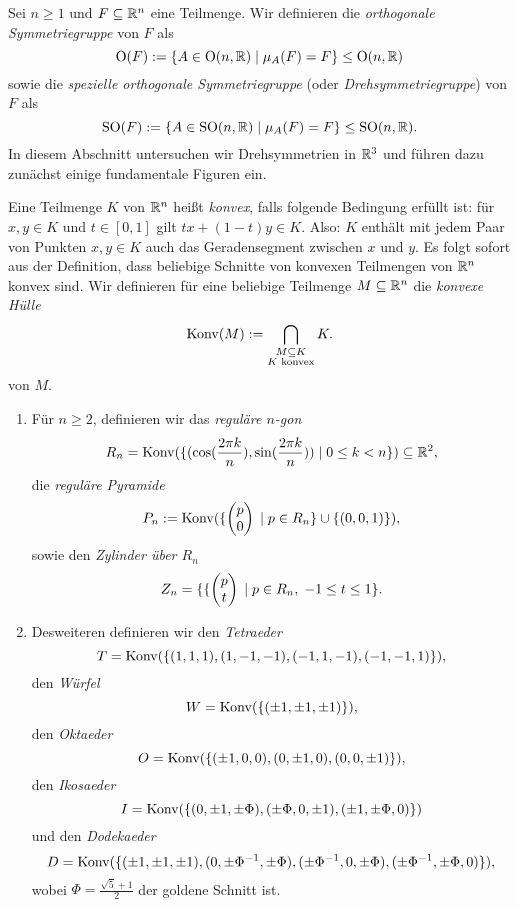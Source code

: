 \documentclass{book}
\begin{document}
Sei $n \ge 1$ und $F \subseteq \mathbb{R}^n$ eine Teilmenge. Wir definieren die {\em orthogonale Symmetriegruppe} von $F$ als
\[
    \operatorname{O}(F) :=  \{ A \in \operatorname{O}(n,\mathbb{R})\; | \; \mu_A(F) = F \} \le \operatorname{O}(n,\mathbb{R})
\]
sowie die {\em spezielle orthogonale Symmetriegruppe} (oder {\em Drehsymmetriegruppe}) von $F$ als 
\[
    \operatorname{SO}(F) :=  \{ A \in \operatorname{SO}(n,\mathbb{R})\; | \; \mu_A(F) = F \} \le \operatorname{SO}(n,\mathbb{R}).
\]
In diesem Abschnitt untersuchen wir Drehsymmetrien in $\mathbb{R}^3$ und führen dazu
zunächst einige fundamentale Figuren ein. 

\begin{exas} 
    \label{exas:figuren}
    Eine Teilmenge $K$ von $\mathbb{R}^n$ heißt {\em konvex}, falls folgende Bedingung
    erfüllt ist: für $x,y \in K$ und $t \in [0,1]$ gilt $t x + (1-t) y \in K$. 
    Also: $K$ enthält mit jedem Paar von Punkten $x,y \in K$ auch das
    Geradensegment zwischen $x$ und $y$. Es folgt sofort aus der Definition,
    dass beliebige Schnitte von konvexen Teilmengen von $\mathbb{R}^n$ konvex sind.
    Wir definieren für eine beliebige Teilmenge $M \subseteq \mathbb{R}^n$ die {\em
        konvexe Hülle}
    \[
        \operatorname{Konv}(M) := \bigcap_{\substack{M \subseteq K\\ \text{$K$ konvex}}} K.
    \]
    von $M$.
    \begin{enumerate}
        \item Für $n \ge 2$, definieren wir das {\em reguläre $n$-gon}
            \[
                R_n = \operatorname{Konv}(\{(\cos(\frac{2 \pi k}{n}), \sin(\frac{2 \pi k}{n}))\; |\; 0 \le k < n \}) \subseteq \mathbb{R}^2,
            \]
            die {\em reguläre Pyramide}
            \[
                P_n := \operatorname{Konv}(\{\begin{pmatrix}  p \\ 0  \end{pmatrix}\; |\;p \in R_n \} \cup \{(0,0,1)\}),
            \]
            sowie den {\em Zylinder über $R_n$}
            \[
                Z_n = \{\{\begin{pmatrix}  p \\ t  \end{pmatrix} \; |\; p \in R_n ,\; -1 \le t \le 1 \}.
            \]
        \item Desweiteren definieren wir den {\em Tetraeder}
            \[
                T = \operatorname{Konv}(\{(1,1,1),(1,-1,-1),(-1,1,-1),(-1,-1,1)\}),
            \]
            den {\em Würfel}
            \[
                W = \operatorname{Konv}(\{ ( \pm 1, \pm 1, \pm 1) \}),
            \]
            den {\em Oktaeder}
            \[
                O = \operatorname{Konv}(\{( \pm 1,0,0), ( 0,\pm 1,0), ( 0,0,\pm 1) \}),
            \]
            den {\em Ikosaeder} 
            \[
                I = \operatorname{Konv}(\{(0, \pm 1, \pm \Phi),
                (\pm \Phi, 0, \pm 1),
                (\pm 1, \pm \Phi, 0) \})
            \]
            und den {\em Dodekaeder}
            \[
                D = \operatorname{Konv}(\{ (\pm 1, \pm 1, \pm 1),
                    (0, \pm \Phi^{-1}, \pm \Phi),
                    (\pm \Phi^{-1}, 0, \pm \Phi),
                    (\pm \Phi^{-1}, \pm \Phi, 0)
                \}),
            \]
            wobei $\Phi = \frac{\sqrt{5} + 1}{2}$ der goldene Schnitt ist. 
    \end{enumerate}
\end{exas}
\end{document}

